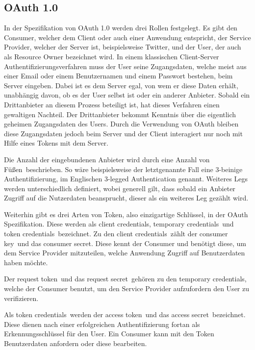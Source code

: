 \subsection{OAuth 1.0}
In der Spezifikation von OAuth 1.0 werden drei Rollen festgelegt.
Es gibt den \frqq Consumer\flqq , welcher dem Client oder auch einer Anwendung entspricht, der \frqq Service Provider\flqq , welcher der Server ist, beispielsweise Twitter, und der \frqq User\flqq , der auch als Resource Owner bezeichnet wird\cite[vgl.][]{oauth10}.
In einem klassischen Client-Server Authentifizierungsverfahren muss der User seine Zugangsdaten, welche meist aus einer Email oder einem Benutzernamen und einem Passwort bestehen, beim Server eingeben\cite[vgl.][]{oauth11}.
Dabei ist es dem Server egal, von wem er diese Daten erhält, unabhängig davon, ob es der User selbst ist oder ein anderer Anbieter\cite[vgl.][]{oauth11}.
Sobald ein Drittanbieter an diesem Prozess beteiligt ist, hat dieses Verfahren einen gewaltigen Nachteil.
Der Drittanbieter bekommt Kenntnis über die eigentlich geheimen Zugangsdaten des Users.
Durch die Verwendung von OAuth bleiben diese Zugangsdaten jedoch beim Server und der Client interagiert nur noch mit Hilfe eines Tokens mit dem Server.

Die Anzahl der eingebundenen Anbieter wird durch eine Anzahl von \frqq Füßen\flqq\ beschrieben.
So wäre beispielsweise der letztgenannte Fall eine 3-beinige Authentifizierung, im Englischen 3-legged Authentication genannt.
Weiteres Legs werden unterschiedlich definiert, wobei generell gilt, dass sobald ein Anbieter Zugriff auf die Nutzerdaten beansprucht, dieser als ein weiteres Leg gezählt wird\cite[vgl.][]{oauth11}.

Weiterhin gibt es drei Arten von Token, also einzigartige Schlüssel, in der OAuth Spezifikation.
Diese werden als \frqq client credentials\flqq , \frqq temporary credentials\flqq\ und \frqq token credentials\flqq\ bezeichnet\cite[vgl.][]{oauth11}.
Zu den \frqq client credentials\flqq\ zählt der \frqq consumer key\flqq\ und das \frqq consumer secret\flqq\cite[vgl.][]{oauth11}.
Diese kennt der Consumer und benötigt diese, um dem Service Provider mitzuteilen, welche Anwendung Zugriff auf Benutzerdaten haben möchte.

Der \frqq request token\flqq\ und das \frqq request secret\flqq\ gehören zu den \frqq temporary credentials\flqq , welche der Consumer benutzt, um den Service Provider aufzufordern den User zu verifizieren\cite[vgl.][]{oauth11}.

Als \frqq token credentials\flqq\ werden der \frqq access token\flqq\ und das \frqq access secret\flqq\ bezeichnet\cite[vgl.][]{oauth11}.
Diese dienen nach einer erfolgreichen Authentifizierung fortan als Erkennungsschlüssel für den User.
Ein Consumer kann mit den Token Benutzerdaten anfordern oder diese bearbeiten.

